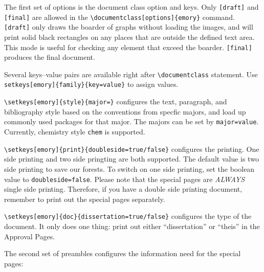 \documentclass[draft]{emory}
\begin{document}
The first set of options is the document class option and keys. Only \verb|[draft]|
and \verb|[final]| are allowed in the \verb|\documentclass[options]{emory}| 
command. \verb|[draft]| only draws the boarder of graphs without loading the images,
and will print solid black rectangles on any places that are outside the defined
text area. This mode is useful for checking any element that exceed the boarder.
\verb|[final]| produces the final document. 

Several keys--value pairs are available right after \verb|\documentclass| statement.
Use \verb|setkeys[emory]{family}{key=value}| to assign values.

\verb|\setkeys[emory]{style}{major=}| configures the text, paragraph, and 
bibliography style based on the conventions
from specfic majors, and load up commonly used packages for that major.
The majors can be set by \verb|major=value|.
Currently, chemistry style \verb|chem| is supported. 

\verb|\setkeys[emory]{print}{doubleside=true/false}| configures the printing.
One side printing and two side pringting are both supported. 
The default value is two side printing to save our forests.
To switch on one side printing, set the boolean value to \verb|doubleside=false|.
Please note that the special pages are \emph{ALWAYS} single side printing. 
Therefore, if you have a double side printing document, remember to print out
the special pages separately.

\verb|\setkeys[emory]{doc}{dissertation=true/false}| configures the type of the 
document. It only does one thing: print out either ``dissertation'' or ``theis''
in the Approval Pages.


The second set of preambles configures the information need for the special pages:
\end{document}
